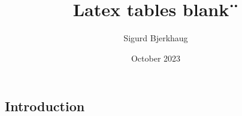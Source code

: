 \documentclass{article}
\title{Latex tables blank¨}
\author{Sigurd Bjerkhaug}
\date{October 2023}
\begin{document}
\maketitle

\newpage



\begin{landscape}
\section{Introduction}




\end{landscape}
\end{document}
